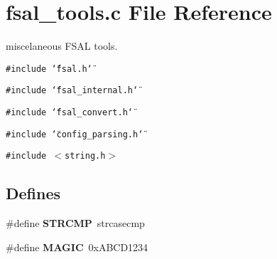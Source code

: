\section{fsal\_\-tools.c File Reference}
\label{fsal__tools_8c}
miscelaneous FSAL tools. 

{\tt \#include \char`\"{}fsal.h\char`\"{}}\par
{\tt \#include \char`\"{}fsal\_\-internal.h\char`\"{}}\par
{\tt \#include \char`\"{}fsal\_\-convert.h\char`\"{}}\par
{\tt \#include \char`\"{}config\_\-parsing.h\char`\"{}}\par
{\tt \#include $<$string.h$>$}\par
\subsection*{Defines}
\begin{CompactItemize}
\item 
\#define {\bf STRCMP}\ strcasecmp\label{fsal__tools_8c_a0}

\item 
\#define {\bf MAGIC}\ 0x\-ABCD1234\label{fsal__tools_8c_a1}

\end{CompactItemize}
